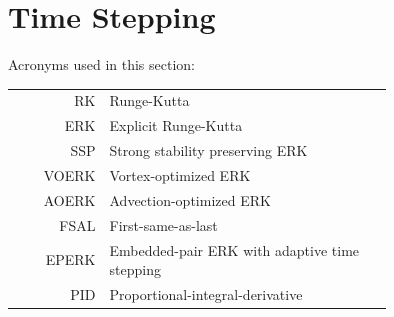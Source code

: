 \section{Time Stepping}
\label{SEC:Time}

\begingroup

\NewDocumentCommand{\eig}{}{\ensuremath{\lambda}}

\vspace{1.0em}
Acronyms used in this section:
\\[1.0em]
\begin{tabular}{ @{} r @{ : } p{0.75\linewidth} @{} }
  RK    & Runge-Kutta \\
  ERK   & Explicit Runge-Kutta \\
  SSP   & Strong stability preserving ERK \\
  VOERK & Vortex-optimized ERK \\
  AOERK & Advection-optimized ERK \\
  FSAL  & First-same-as-last \\
  EPERK & Embedded-pair ERK with adaptive time stepping \\
  PID   & Proportional-integral-derivative
\end{tabular}











\endgroup


